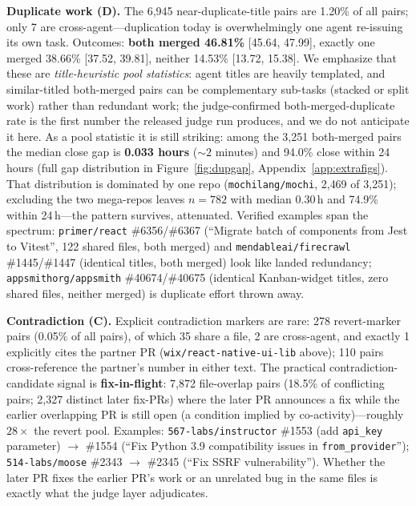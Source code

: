 \documentclass{article}
\begin{document}
\textbf{Duplicate work (D).}
The 6{,}945 near-duplicate-title pairs are 1.20\% of all pairs; only 7 are cross-agent---duplication today is overwhelmingly one agent re-issuing its own task. %
Outcomes: \textbf{both merged 46.81\%} [45.64, 47.99], exactly one merged 38.66\% [37.52, 39.81], neither 14.53\% [13.72, 15.38]. %
We emphasize that these are \emph{title-heuristic pool statistics}: agent titles are heavily templated, and similar-titled both-merged pairs can be complementary sub-tasks (stacked or split work) rather than redundant work; the judge-confirmed both-merged-duplicate rate is the first number the released judge run produces, and we do not anticipate it here. %
 As a pool statistic it is still striking: among the 3{,}251 both-merged pairs the median close gap is \textbf{0.033 hours} (${\sim}2$ minutes) and 94.0\% close within 24 hours (full gap distribution in Figure~\ref{fig:dupgap}, Appendix~\ref{app:extrafigs}). %
That distribution is dominated by one repo (\texttt{mochilang/mochi}, 2{,}469 of 3{,}251); excluding the two mega-repos leaves $n=782$ with median 0.30\,h and 74.9\% within 24\,h---the pattern survives, attenuated. %
Verified examples span the spectrum: \texttt{primer/react} \#6356/\#6367 (``Migrate batch of components from Jest to Vitest'', 122 shared files, both merged) and \texttt{mendableai/firecrawl} \#1445/\#1447 (identical titles, both merged) look like landed redundancy; \texttt{appsmithorg/appsmith} \#40674/\#40675 (identical Kanban-widget titles, zero shared files, neither merged) is duplicate effort thrown away. %

\textbf{Contradiction (C).}
Explicit contradiction markers are rare: 278 revert-marker pairs (0.05\% of all pairs), of which 35 share a file, 2 are cross-agent, and exactly 1 explicitly cites the partner PR (\texttt{wix/react-native-ui-lib} above); 110 pairs cross-reference the partner's number in either text. %
The practical contradiction-candidate signal is \textbf{fix-in-flight}: 7{,}872 file-overlap pairs (18.5\% of conflicting pairs; 2{,}327 distinct later fix-PRs) where the later PR announces a fix while the earlier overlapping PR is still open (a condition implied by co-activity)---roughly $28\times$ the revert pool. %
Examples: \texttt{567-labs/instructor} \#1553 (add \texttt{api\_key} parameter) $\rightarrow$ \#1554 (``Fix Python 3.9 compatibility issues in \texttt{from\_provider}''); \texttt{514-labs/moose} \#2343 $\rightarrow$ \#2345 (``Fix SSRF vulnerability''). %
Whether the later PR fixes the earlier PR's work or an unrelated bug in the same files is exactly what the judge layer adjudicates.
\end{document}
